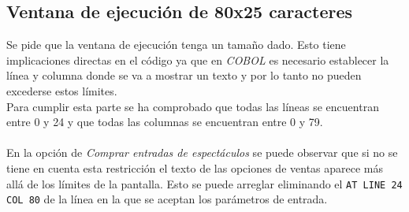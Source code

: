 \documentclass[10pt,a4paper]{article}
\begin{document}
\subsection{Ventana de ejecución de 80x25 caracteres}

Se pide que la ventana de ejecución tenga un tamaño dado. Esto tiene implicaciones directas en el código ya que en \emph{COBOL} es necesario establecer la línea y columna donde se va a mostrar un texto y por lo tanto no pueden excederse estos límites.\\
Para cumplir esta parte se ha comprobado que todas las líneas se encuentran entre 0 y 24 y que todas las columnas se encuentran entre 0 y 79.\\
\\
En la opción de \emph{Comprar entradas de espectáculos} se puede observar que si no se tiene en cuenta esta restricción el texto de las opciones de ventas aparece más allá de los límites de la pantalla. Esto se puede arreglar eliminando el \texttt{AT LINE 24 COL 80} de la línea en la que se aceptan los parámetros de entrada.
\end{document}

